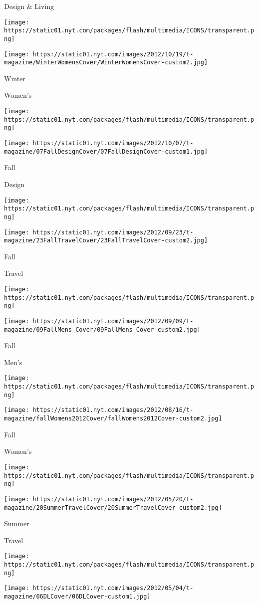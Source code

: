 Design \& Living

\texttt{[image: https://static01.nyt.com/packages/flash/multimedia/ICONS/transparent.png]}

\texttt{[image: https://static01.nyt.com/images/2012/10/19/t-magazine/WinterWomensCover/WinterWomensCover-custom2.jpg]}

Winter

Women's

\texttt{[image: https://static01.nyt.com/packages/flash/multimedia/ICONS/transparent.png]}

\texttt{[image: https://static01.nyt.com/images/2012/10/07/t-magazine/07FallDesignCover/07FallDesignCover-custom1.jpg]}

Fall

Design

\texttt{[image: https://static01.nyt.com/packages/flash/multimedia/ICONS/transparent.png]}

\texttt{[image: https://static01.nyt.com/images/2012/09/23/t-magazine/23FallTravelCover/23FallTravelCover-custom2.jpg]}

Fall

Travel

\texttt{[image: https://static01.nyt.com/packages/flash/multimedia/ICONS/transparent.png]}

\texttt{[image: https://static01.nyt.com/images/2012/09/09/t-magazine/09FallMens\_Cover/09FallMens\_Cover-custom2.jpg]}

Fall

Men's

\texttt{[image: https://static01.nyt.com/packages/flash/multimedia/ICONS/transparent.png]}

\texttt{[image: https://static01.nyt.com/images/2012/08/16/t-magazine/fallWomens2012Cover/fallWomens2012Cover-custom2.jpg]}

Fall

Women's

\texttt{[image: https://static01.nyt.com/packages/flash/multimedia/ICONS/transparent.png]}

\texttt{[image: https://static01.nyt.com/images/2012/05/20/t-magazine/20SummerTravelCover/20SummerTravelCover-custom2.jpg]}

Summer

Travel

\texttt{[image: https://static01.nyt.com/packages/flash/multimedia/ICONS/transparent.png]}

\texttt{[image: https://static01.nyt.com/images/2012/05/04/t-magazine/06DLCover/06DLCover-custom1.jpg]}

